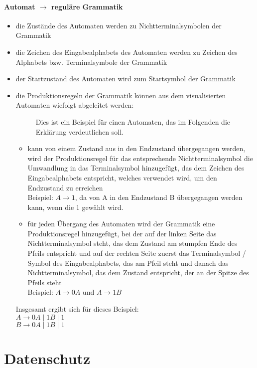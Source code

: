 \documentclass{article}
\begin{document}
	\paragraph{Automat $\rightarrow$ reguläre Grammatik}
	\begin{itemize}
		\item die Zustände des Automaten werden zu Nichtterminalsymbolen der Grammatik
		\item die Zeichen des Eingabealphabets des Automaten werden zu Zeichen des Alphabets bzw. Terminalsymbole der Grammatik
		\item der Startzustand des Automaten wird zum Startsymbol der Grammatik
		\item die Produktionsregeln der Grammatik können aus dem visualisierten Automaten wiefolgt abgeleitet werden: 
		\begin{figure}[H]
			\centering
			
			\caption{Dies ist ein Beispiel für einen Automaten, das im Folgenden die Erklärung verdeutlichen soll.}
		\end{figure}	
		\begin{itemize}
			\item kann von einem Zustand aus in den Endzustand übergegangen werden, wird der Produktionsregel für das entsprechende Nichtterminalsymbol die Umwandlung in das Terminalsymbol hinzugefügt, das dem Zeichen des Eingabealphabets entspricht, welches verwendet wird, um den Endzustand zu erreichen \\
			Beispiel: $A \rightarrow 1$, da von A in den Endzustand B übergegangen werden kann, wenn die 1 gewählt wird.
			\item für jeden Übergang des Automaten wird der Grammatik eine Produktionsregel hinzugefügt, bei der auf der linken Seite das Nichtterminalsymbol steht, das dem Zustand am stumpfen Ende des Pfeils entspricht und auf der rechten Seite zuerst das Terminalsymbol / Symbol des Eingabealphabets, das am Pfeil steht und danach das Nichtterminalsymbol, das dem Zustand entspricht, der an der Spitze des Pfeils steht \\
			Beispiel: $A \rightarrow 0A$ und $A \rightarrow 1B$
		\end{itemize}
		Insgesamt ergibt sich für dieses Beispiel: \\
		$A \rightarrow 0A \mid 1B \mid 1$ \\
		$B \rightarrow 0A \mid 1B \mid 1$
	\end{itemize}

	\section{Datenschutz}
\end{document}
